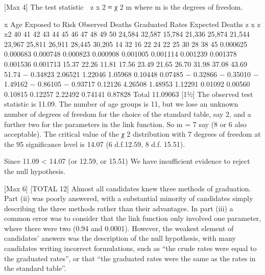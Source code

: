 \documentclass[a4paper,12pt]{article}
\begin{document}
[Max 4]
The test statistic
 z x 2 ≈ χ 2 m where m is the degrees of freedom.

x
Age Exposed to
Risk Observed
Deaths Graduated
Rates Expected
Deaths z x z x2
40
41
42
43
44
45
46
47
48
49
50 24,584
32,587
15,784
21,336
25,874
21,544
23,967
25,811
26,911
28,445
30,205 14
32
16
22
24
22
25
30
28
38
45 0.000625
0.000683
0.000748
0.000823
0.000908
0.001005
0.001114
0.001239
0.001378
0.001536
0.001713 15.37
22.26
11.81
17.56
23.49
21.65
26.70
31.98
37.08
43.69
51.74 − 0.34823
2.06521
1.22046
1.05968
0.10448
0.07485
− 0.32866
− 0.35010
− 1.49162
− 0.86105
− 0.93717 0.12126
4.26508
1.48953
1.12291
0.01092
0.00560
0.10815
0.12257
2.22492
0.74141
0.87828
Total
11.09063
[11⁄2]
The observed test statistic is 11.09. 
The number of age groups is 11, 
but we lose an unknown number of degrees
of freedom for the choice of the standard table, say 2, 
and a further two for the parameters in the link function. 
So m = 7 say (8 or 6 also acceptable). 
The critical value of the χ 2 distribution with 7 degrees of freedom at the 95%
significance level is 14.07 (6 d.f.12.59, 8 d.f. 15.51).

Since 11.09 < 14.07 (or 12.59, or 15.51)
We have insufficient evidence to reject the null hypothesis.


[Max 6]
[TOTAL 12]
Almost all candidates knew three methods of graduation. Part (ii) was poorly
answered, with a substantial minority of candidates simply describing the
three methods rather than their advantages. In part (iii) a common error was
to consider that the link function only involved one parameter, where there
were two (0.94 and 0.0001). However, the weakest element of candidates’
answers was the description of the null hypothesis, with many candidates
writing incorrect formulations, such as “the crude rates were equal to the
graduated rates”, or that “the graduated rates were the same as the rates in
the standard table”.
\end{document}
